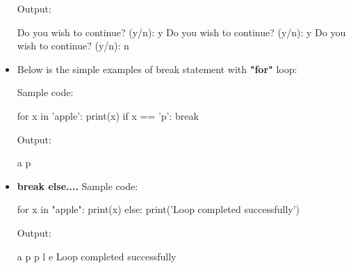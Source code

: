 \begin{flushleft}
\begin{itemize}
			Output:
			\begin{tcolorbox}[breakable,notitle,boxrule=-0pt,colback=output,colframe=output]
				\color{black}
				Do you wish to continue? (y/n): y \newline
				Do you wish to continue? (y/n): y \newline
				Do you wish to continue? (y/n): n
				\font=4pt
			\end{tcolorbox}
		
			\item Below is the simple examples of break statement with \textbf{"for"} loop:
			
			Sample code:
			\begin{tcolorbox}[breakable,notitle,boxrule=-0pt,colback=code,colframe=code]
				\color{white}
				\font=8pt
				for x in 'apple': \newline
				\hphantom{} \hphantom{} print(x) \newline
				\hphantom{} \hphantom{} if x == 'p': \newline
				\hphantom{} \hphantom{} \hphantom{} \hphantom{} break
				\fontdimen2\font=4pt
			\end{tcolorbox}
			
			Output:
			\begin{tcolorbox}[breakable,notitle,boxrule=-0pt,colback=output,colframe=output]
				\color{black}
				a \newline
				p
				\fontdimen2\font=4pt
			\end{tcolorbox}
		
			\bigskip
			\item \textbf{break else....}
			\newline
			Sample code:
			\begin{tcolorbox}[breakable,notitle,boxrule=-0pt,colback=code,colframe=code]
				\color{white}
				\fontdimen2\font=8pt
				for x in "apple": \newline
				\hphantom{} \hphantom{} print(x)  \newline
				else: \newline
				\hphantom{} \hphantom{} print('Loop completed successfully')
				\font=4pt
			\end{tcolorbox}
			
			Output:
			\begin{tcolorbox}[breakable,notitle,boxrule=-0pt,colback=output,colframe=output]
				\color{black}
				a \newline
				p \newline
				p \newline
				l \newline
				e \newline
				Loop completed successfully
				\font=4pt
			\end{tcolorbox}
			
		\end{itemize}
	
		
	
\end{flushleft}


\newpage


